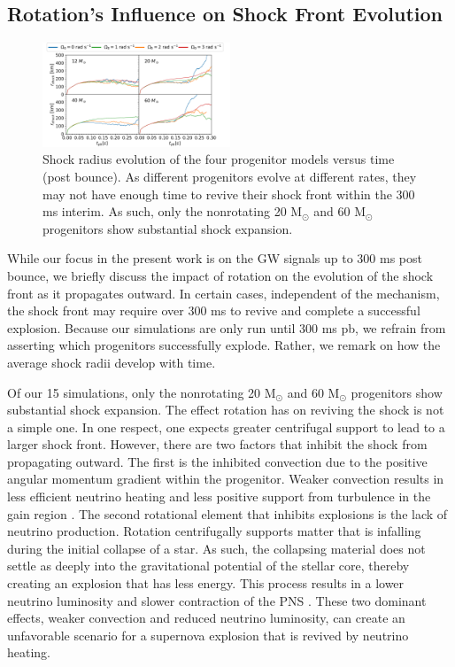 \documentclass[twocolumn,times]{aastex62}  %
\newcommand{\Msun}{\ensuremath{\mathrm{M}_\odot}\xspace}
\begin{document}
\subsection{Rotation's Influence on Shock Front Evolution}

\begin{figure}[t]
    \centering
    \includegraphics[width = 0.5\textwidth]{figures/M1_shock_mass_raster.pdf}
    \caption{Shock radius evolution of the four progenitor models versus time (post bounce).  As different progenitors evolve at different rates, they may not have enough time to revive their shock front within the 300 ms interim.  As such, only the nonrotating 20 \Msun and 60 \Msun progenitors show substantial shock expansion. }
    \label{fig:shock}
\end{figure} 

While our focus in the present work is on the GW signals up to 300 ms post bounce, we briefly discuss the impact of rotation on the evolution of the shock front as it propagates outward.  In certain cases, independent of the mechanism, the shock front may require over 300 ms to revive and complete a successful explosion.  Because our simulations are only run until 300 ms pb, we refrain from asserting which progenitors successfully explode.  Rather, we remark on how the average shock radii develop with time.

Of our 15 simulations, only the nonrotating 20 \Msun and 60 \Msun progenitors show substantial shock expansion.  The effect rotation has on reviving the shock is not a simple one. 
In one respect, one expects greater centrifugal support to lead to a larger shock front.  However, there are two factors that inhibit the shock from propagating outward.  The first is the inhibited convection due to the positive angular momentum gradient within the progenitor. Weaker convection results in less efficient neutrino heating \citep{dolence:2013, murphy:2013} and less positive support from turbulence in the gain region \citep{couch:2015a, mabanta:2018}.  The  second rotational element that inhibits explosions is the lack of neutrino production.  Rotation centrifugally supports matter that is infalling during the initial collapse of a star.  As such, the collapsing material does not settle as deeply into the gravitational potential of the stellar core, thereby creating an explosion that has less energy.  This process results in a lower neutrino luminosity and slower contraction of the PNS \citep{summa:2018}. 
These two dominant effects, weaker convection and reduced neutrino luminosity, can create an unfavorable scenario for a supernova explosion that is revived by neutrino heating.
\end{document}
